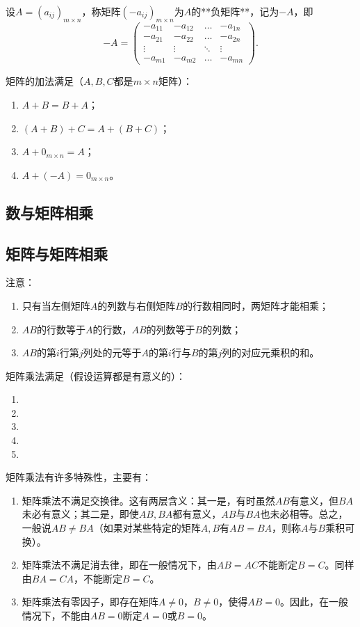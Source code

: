 设$A=(a_{ij})_{m\times n}$，称矩阵$(-a_{ij})_{m\times n}$为$A$的**负矩阵**，记为$-A$，即
\[
-A=
\begin{pmatrix}
-a_{11}&-a_{12}&\dots&-a_{1n}\\
-a_{21}&-a_{22}&\dots&-a_{2n}\\
\vdots&\vdots&\ddots&\vdots \\
-a_{m1}&-a_{m2}&\dots&-a_{mn}
\end{pmatrix}.
\]

矩阵的加法满足（$A,B,C$都是$m\times n$矩阵）：
\begin{enumerate}
    \item $A+B=B+A$；
    \item $(A+B)+C=A+(B+C)$；
    \item $A+0_{m\times n}=A$；
    \item $A+(-A)=0_{m\times n}$。
\end{enumerate}

\subsection{数与矩阵相乘}
\begin{definition}
\end{definition}

\subsection{矩阵与矩阵相乘}
注意：
\begin{enumerate}
    \item 只有当左侧矩阵$A$的列数与右侧矩阵$B$的行数相同时，两矩阵才能相乘；
    \item $AB$的行数等于$A$的行数，$AB$的列数等于$B$的列数；
    \item $AB$的第$i$行第$j$列处的元等于$A$的第$i$行与$B$的第$j$列的对应元乘积的和。
\end{enumerate}

矩阵乘法满足（假设运算都是有意义的）：
\begin{enumerate}
    \item %
    \item %
    \item %
    \item %
    \item %
\end{enumerate}

矩阵乘法有许多特殊性，主要有：
\begin{enumerate}
    \item 矩阵乘法不满足交换律。这有两层含义：其一是，有时虽然$AB$有意义，但$BA$未必有意义；其二是，即使$AB,BA$都有意义，$AB$与$BA$也未必相等。总之，一般说$AB\neq BA$（如果对某些特定的矩阵$A,B$有$AB=BA$，则称$A$与$B$乘积可换）。
    \item 矩阵乘法不满足消去律，即在一般情况下，由$AB=AC$不能断定$B=C$。同样由$BA=CA$，不能断定$B=C$。
    \item 矩阵乘法有零因子，即存在矩阵$A\neq 0$，$B\neq 0$，使得$AB=0$。因此，在一般情况下，不能由$AB=0$断定$A=0$或$B=0$。
\end{enumerate}


